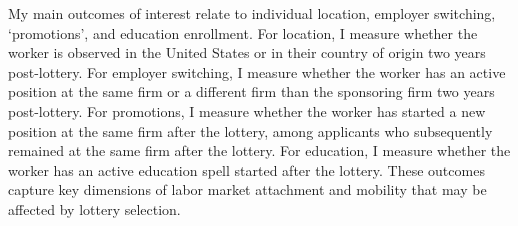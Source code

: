My main outcomes of interest relate to individual location, employer switching, `promotions', and education enrollment. For location, I measure whether the worker is observed in the United States or in their country of origin two years post-lottery. For employer switching, I measure whether the worker has an active position at the same firm or a different firm than the sponsoring firm two years post-lottery. For promotions, I measure whether the worker has started a new position at the same firm after the lottery, among applicants who subsequently remained at the same firm after the lottery. For education, I measure whether the worker has an active education spell started after the lottery. These outcomes capture key dimensions of labor market attachment and mobility that may be affected by lottery selection.

